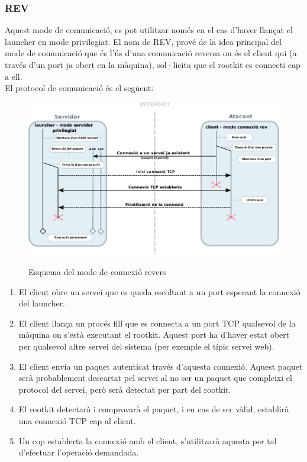 \subsubsection{REV}

Aquest mode de comunicació, es pot utilitzar només en el cas d'haver llançat el launcher en mode privilegiat.
El nom de REV, prové de la idea principal del mode de comunicació que és l'ús d'una comunicació reversa on 
és el client qui (a través d'un port ja obert en la màquina), sol·licita que el rootkit es connecti cap a ell. \\

El protocol de comunicació és el següent: \\

\begin{figure}[htp]
    \centering
    \includegraphics[scale=1,keepaspectratio]{diagrames/solutionDesignPrivilegedServerModeREV.pdf} \\
    \caption{Esquema del mode de connexió revers}
    \label{fig:modePrivilegedServerREV}
\end{figure}

\begin{enumerate}
    \item El client obre un servei que es queda escoltant a un port esperant la connexió del launcher.
    \item El client llança un procés fill que es connecta a un port TCP qualsevol de la màquina on s'està 
        executant el rootkit. Aquest port ha d'haver estat obert per qualsevol altre servei del sistema (per 
        exemple el típic servei web).
    \item El client envia un paquet autenticat través d'aquesta connexió. Aquest paquet serà probablement  
        descartat pel servei al no ser un paquet que compleixi el protocol del servei, però serà detectat per
        part del rootkit.
    \item El rootkit detectarà i comprovarà el paquet, i en cas de ser vàlid, establirà una connexió TCP cap 
        al client.
    \item Un cop establerta la connexió amb el client, s'utilitzarà aquesta per tal d'efectuar l'operació 
        demandada.
\end{enumerate}

